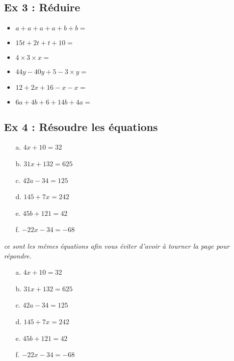\subsection*{Ex 3 : Réduire}

\begin{multicols}{2}\begin{itemize}[label={$\bullet$}]
  \item $a+a+a+a+b+b =$ \dotfill
  \item $15t + 2t + t +10 = $\dotfill
  \item $4 \times 3 \times x = $ \dotfill
  \item $44y - 40y + 5 - 3 \times y = $\dotfill
  \item $12 + 2x + 16 - x - x =$\dotfill
  \item $6a + 4b + 6+ 14b + 4a =$\dotfill
\end{itemize}\end{multicols}


\subsection*{Ex 4 : Résoudre les équations}

\begin{multicols}{3}\begin{enumerate}
  \item[a.] $4x + 10 = 32$
  \item[b.] $31x + 132 = 625$
  \item[c.] $42a - 34 = 125$
  \item[d.] $145 + 7x = 242$
  \item[e.] $45b + 121 = 42$
  \item[f.] $-22x -34 =-68$   
\end{enumerate}\end{multicols}

\Pointilles[20] \newpage 

\begin{center}\textit{ce sont les mêmes équations afin vous éviter d'avoir à tourner la page pour répondre.}\end{center}

\begin{multicols}{3}\begin{enumerate}
  \item[a.] $4x + 10 = 32$
  \item[b.] $31x + 132 = 625$
  \item[c.] $42a - 34 = 125$
  \item[d.] $145 + 7x = 242$
  \item[e.] $45b + 121 = 42$
  \item[f.] $-22x -34 =-68$   
\end{enumerate}\end{multicols}

\Pointilles[46]


